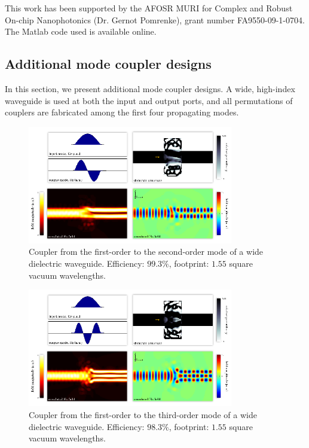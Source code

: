 \documentclass[letterpaper,10pt]{article}
\begin{document}
This work has been supported by the 
    AFOSR MURI for Complex and Robust On-chip Nanophotonics 
    (Dr. Gernot Pomrenke), grant number FA9550-09-1-0704.
The Matlab code used is available online\cite{code}.
\clearpage
\begin{appendix}
\section{Additional mode coupler designs}
In this section, we present additional mode coupler designs.
A wide, high-index waveguide is used at both the input and output ports,
    and all permutations of couplers are fabricated among
    the first four propagating modes.
\begin{figure}[h!]
    \centering
    \includegraphics[width=0.8\textwidth]{6}
    \caption{
        Coupler from the first-order to the second-order mode 
            of a wide dielectric waveguide.
        Efficiency: $99.3\%$,
        footprint: $1.55$ square vacuum wavelengths.
        }
\end{figure}
\begin{figure}[h!]
    \centering
    \includegraphics[width=0.8\textwidth]{7}
    \caption{
        Coupler from the first-order to the third-order mode 
            of a wide dielectric waveguide.
        Efficiency: $98.3\%$,
        footprint: $1.55$ square vacuum wavelengths.
}
\end{figure}
\end{appendix}
\end{document}
